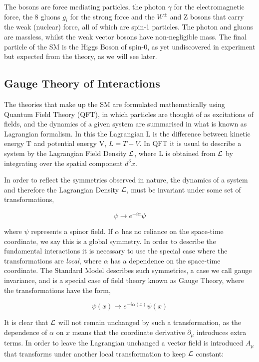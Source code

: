 The bosons are force mediating particles, the photon $\gamma$ for the electromagnetic force, the 8 gluons $g_{i}$ for the strong force and the $W^{\pm}$ and Z bosons that carry the weak (nuclear) force, all of which are spin-1 particles. The photon and gluons are massless, whilst the weak vector bosons have non-negligible mass. The final particle of the SM is the Higgs Boson of spin-0, as yet undiscovered in experiment but expected from the theory, as we will see later. 

\subsection{Gauge Theory of Interactions}

The theories that make up the SM are formulated mathematically using Quantum Field Theory (QFT), in which particles are thought of as excitations of fields, and the dynamics of a given system are summarised in what is known as Lagrangian formalism. In this the Lagrangian L is the difference between kinetic energy T and potential energy V, $L = T - V$. In QFT it is usual to describe a system by the Lagrangian Field Density ${\mathcal{L}}$, where L is obtained from ${\mathcal{L}}$ by integrating over the spatial component $d^{3}x$.


In order to reflect the symmetries observed in nature, the dynamics of a system and therefore the Lagrangian Density ${\mathcal{L}}$, must be invariant under some set of transformations,

\begin{equation}
\psi \rightarrow e^{-i\alpha}\psi 
\label{GlobalTrans}
\end{equation}


where $\psi$ represents a spinor field. If $\alpha$ has no reliance on the space-time coordinate, we say this is a global symmetry. In order to describe the fundamental interactions it is necessary to use the special case where the transformations are \textit{local}, where $\alpha$ has a dependence on the space-time coordinate. The Standard Model describes such symmetries, a case we call gauge invariance, and is a special case of field theory known as Gauge Theory, where the transformations have the form, 


\begin{equation}
\psi(x) \rightarrow e^{-i\alpha(x)}\psi (x) 
\label{LocalTrans}
\end{equation}


It is clear that ${\mathcal{L}}$ will not remain unchanged by such a transformation, as the dependence of $\alpha$ on $x$ means that the coordinate derivative $\partial_{\mu}$ introduces extra terms. In order to leave the Lagrangian unchanged a vector field is introduced $A_{\mu}$ that transforms under another local transformation to keep ${\mathcal{L}}$ constant: 

